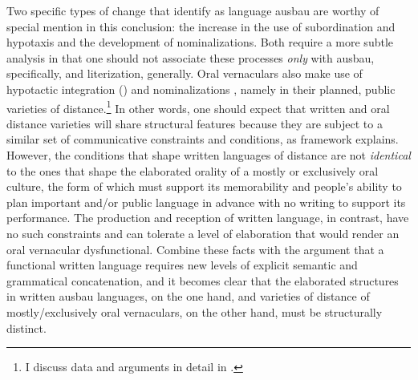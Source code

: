 Two specific types of change that \citet{KochOesterreicher1994} identify as language ausbau are worthy of special mention in this conclusion: the increase in the use of subordination and hypotaxis and the development of nominalizations. Both require a more subtle analysis in that one should not associate these processes \textit{only} with ausbau, specifically, and literization, generally. Oral vernaculars also make use of hypotactic integration (\citealt[282--284; 308--310]{HarrisCampbell1995}) and nominalizations \citep{Chafe1981}, namely in their planned, public varieties of distance.\footnote{{I discuss  data and arguments in detail in .}} In other words, one should expect that written and oral distance varieties will share structural features because they are subject to a similar set of communicative constraints and conditions, as  framework explains. However, the conditions that shape written languages of distance are not \textit{identical} to the ones that shape the elaborated orality of a mostly or exclusively oral culture, the form of which must support its memorability and people’s ability to plan important and/or public language in advance with no writing to support its performance. The production and reception of written language, in contrast, have no such constraints and can tolerate a level of elaboration that would render an oral vernacular dysfunctional. Combine these facts with the argument that a functional written language requires new levels of explicit semantic and grammatical concatenation, and it becomes clear that the elaborated structures in written ausbau languages, on the one hand, and varieties of distance of mostly/exclusively oral vernaculars, on the other hand, must be structurally distinct.

